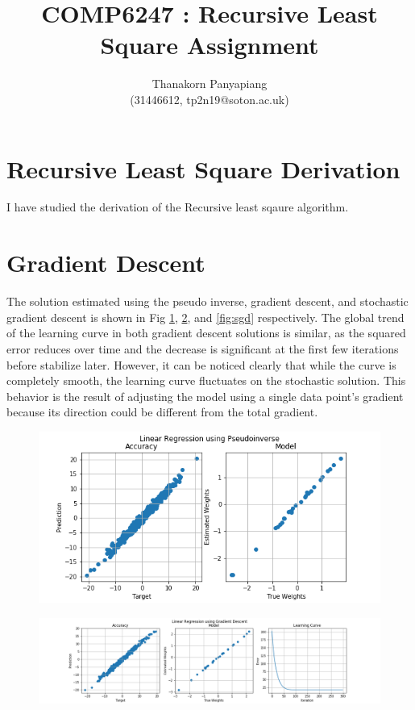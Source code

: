 \documentclass{article}
\title{COMP6247 : Recursive Least Square Assignment}
\author{Thanakorn Panyapiang\\
(31446612, tp2n19@soton.ac.uk)}
\date{}
\begin{document}
\maketitle

\section{Recursive Least Square Derivation}
I have studied the derivation of the Recursive least sqaure algorithm.

\section{Gradient Descent}

The solution estimated using the pseudo inverse, gradient descent, and stochastic gradient descent is shown in Fig \ref{fig:pi}, \ref{fig:gd}, and \ref{fig:sgd} respectively. The global trend of the learning curve in both gradient descent solutions is similar, as the squared error reduces over time and the decrease is significant at the first few iterations before stabilize later. However, it can be noticed clearly that while the curve is completely smooth, the learning curve fluctuates on the stochastic solution. This behavior is the result of adjusting the model using a single data point's gradient because its direction could be different from the total gradient.

\begin{figure}[H]
\begin{center}
\includegraphics[scale=0.25]{PI.png}
\label{fig:pi}
\end{center}
\end{figure}

\begin{figure}[H]
\begin{center}
\includegraphics[scale=0.3]{GD.png}
\label{fig:gd}
\end{center}
\end{figure}
\end{document}
